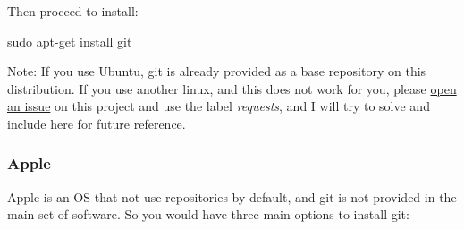 \documentclass[
]{book}
\newenvironment{Shaded}{\begin{snugshade}}{\end{snugshade}}
\newcommand{\FunctionTok}[1]{\textcolor[rgb]{0.00,0.00,0.00}{#1}}
\newcommand{\NormalTok}[1]{#1}
\begin{document}
Then proceed to install:

\begin{Shaded}
\begin{Highlighting}[]
\FunctionTok{sudo}\NormalTok{ apt{-}get install git}
\end{Highlighting}
\end{Shaded}

Note: If you use Ubuntu, git is already provided as a base repository on this
distribution. If you use another linux, and this does not work for you, please
\href{https://github.com/ricardobarroslourenco/CCprimer/issues}{open an issue} on
this project and use the label \emph{requests}, and I will try to solve and include
here for future reference.

\hypertarget{apple}{%
\subsubsection{Apple}\label{apple}}

Apple is an OS that not use repositories by default, and git is not provided in
the main set of software. So you would have three main options to install git:
\end{document}
